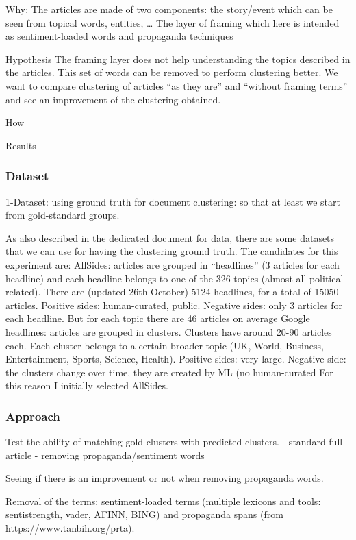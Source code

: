 Why:
The articles are made of two components:
the story/event which can be seen from topical words, entities, …
The layer of framing which here is intended as sentiment-loaded words and propaganda techniques

Hypothesis
The framing layer does not help understanding the topics described in the articles. This set of words can be removed to perform clustering better.
We want to compare clustering of articles “as they are” and “without framing terms” and see an improvement of the clustering obtained.


How

Results

\subsubsection{Dataset}

1-Dataset: using ground truth for document clustering: so that at least we start from gold-standard groups.

As also described in the dedicated document for data, there are some datasets that we can use for having the clustering ground truth. The candidates for this experiment are:
AllSides: articles are grouped in “headlines” (3 articles for each headline) and each headline belongs to one of the 326 topics (almost all political-related). There are (updated 26th October) 5124 headlines, for a total of 15050 articles. Positive sides: human-curated, public. Negative sides: only 3 articles for each headline. But for each topic there are 46 articles on average
Google headlines: articles are grouped in clusters. Clusters have around 20-90 articles each. Each cluster belongs to a certain broader topic (UK, World, Business, Entertainment, Sports, Science, Health). Positive sides: very large. Negative side: the clusters change over time, they are created by ML (no human-curated
For this reason I initially selected AllSides.

\subsubsection{Approach}

Test the ability of matching gold clusters with predicted clusters.
- standard full article
- removing propaganda/sentiment words

Seeing if there is an improvement or not when removing propaganda words.

Removal of the terms: sentiment-loaded terms (multiple lexicons and tools: sentistrength, vader, AFINN, BING) and propaganda spans (from https://www.tanbih.org/prta).

